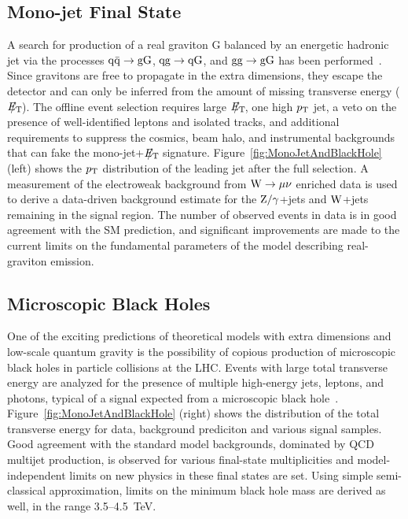 \documentclass[11pt]{article}
\def\etmiss {\ensuremath{E_{\mathrm{T}}\hspace{-1.1em}/\kern0.5em}\xspace}
\def\pt{\ensuremath{p_{\rm T}}\xspace}
\def\zjets{\ensuremath{\rm{Z}/\gamma}+jets\xspace}
\def\wjets{\ensuremath{\rm{W}}+jets\xspace}
\begin{document}
\subsection{Mono-jet Final State}
A search for production of a real graviton G 
balanced by an energetic hadronic jet via the processes 
$\rm{q}\bar{\rm{q}} \rightarrow \rm{gG}$, $\rm{q}\rm{g} \rightarrow \rm{qG}$, 
and $\rm{g}\rm{g} \rightarrow \rm{gG}$ has been performed~\cite{CMSPAPER:EXO-11-003}. 
Since gravitons are free to propagate in the extra dimensions, they escape 
the detector and can only be inferred from the amount of missing transverse energy (\etmiss). 
The offline event selection requires large \etmiss, one high \pt jet, a veto on the 
presence of well-identified leptons and isolated tracks, and additional 
requirements to suppress the cosmics, beam halo, and instrumental backgrounds 
that can fake the mono-jet+\etmiss signature. 
Figure~\ref{fig:MonoJetAndBlackHole} (left) shows the \pt distribution of the leading jet after the full selection. 
A measurement of the electroweak background from $\rm{W} \rightarrow \mu\nu$ enriched 
data is used to derive a data-driven background estimate for the \zjets and \wjets remaining 
in the signal region. The number of observed events in data is in good agreement with the SM prediction, 
and significant improvements are made to the current limits on the fundamental parameters of 
the model describing real-graviton emission.

\subsection{Microscopic Black Holes}
One of the exciting predictions of theoretical models with extra dimensions 
and low-scale quantum gravity is the possibility of copious production of microscopic black 
holes in particle collisions at the LHC.
Events with large total transverse energy are analyzed for the presence
of multiple high-energy jets, leptons, and photons, typical of a signal expected from a microscopic black 
hole~\cite{Khachatryan2011434}. 
Figure~\ref{fig:MonoJetAndBlackHole} (right) shows the distribution of the total transverse energy for data, 
background prediciton and various signal samples. Good agreement with the standard model backgrounds, 
dominated by QCD multijet production, is observed for various final-state multiplicities 
and model-independent limits on new physics in these final states are set. 
Using simple semi-classical approximation, limits on the minimum black hole 
mass are derived as well, in the range 3.5--4.5~TeV.
\end{document}
